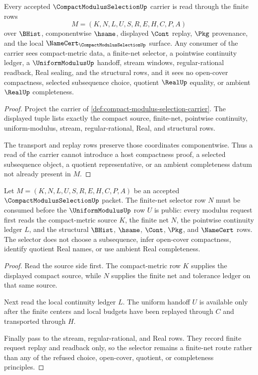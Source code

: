 \begin{theorem}
\label{thm:compact-modulus-selection-carrier}
Every accepted $\CompactModulusSelectionUp$ carrier is read through the finite rows
$$
M=(K,N,L,U,S,R,E,H,C,P,A)
$$
over $\BHist$, componentwise $\hsame$, displayed $\Cont$ replay, $\Pkg$ provenance, and the local $\NameCert_{\CompactModulusSelectionUp}$ surface. Any consumer of the carrier sees compact-metric data, a finite-net selector, a pointwise continuity ledger, a $\UniformModulusUp$ handoff, stream windows, regular-rational readback, Real sealing, and the structural rows, and it sees no open-cover compactness, selected subsequence choice, quotient $\RealUp$ equality, or ambient $\RealUp$ completeness.
\end{theorem}
\begin{proof}
Project the carrier of \autoref{def:compact-modulus-selection-carrier}. The displayed tuple lists exactly the compact source, finite-net, pointwise continuity, uniform-modulus, stream, regular-rational, Real, and structural rows.

The transport and replay rows preserve those coordinates componentwise. Thus a read of the carrier cannot introduce a host compactness proof, a selected subsequence object, a quotient representative, or an ambient completeness datum not already present in $M$.
\end{proof}

\begin{theorem}
\label{thm:compact-modulus-selection-net-selector}
Let $M=(K,N,L,U,S,R,E,H,C,P,A)$ be an accepted $\CompactModulusSelectionUp$ packet. The finite-net selector row $N$ must be consumed before the $\UniformModulusUp$ row $U$ is public: every modulus request first reads the compact-metric source $K$, the finite net $N$, the pointwise continuity ledger $L$, and the structural $\BHist$, $\hsame$, $\Cont$, $\Pkg$, and $\NameCert$ rows. The selector does not choose a subsequence, infer open-cover compactness, identify quotient Real names, or use ambient Real completeness.
\end{theorem}
\begin{proof}
Read the source side first. The compact-metric row $K$ supplies the displayed compact source, while $N$ supplies the finite net and tolerance ledger on that same source.

Next read the local continuity ledger $L$. The uniform handoff $U$ is available only after the finite centers and local budgets have been replayed through $C$ and transported through $H$.

Finally pass to the stream, regular-rational, and Real rows. They record finite request replay and readback only, so the selector remains a finite-net route rather than any of the refused choice, open-cover, quotient, or completeness principles.
\end{proof}

